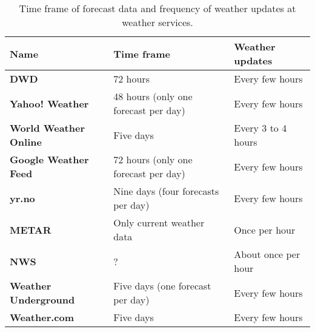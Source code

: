 \begin{table}
\centering
\begin{tabular}{|p{}|p{}|p{}|}
  \hline
  \textbf{Name} & \textbf{Time frame} & \textbf{Weather updates} \\
  \hline\hline
  \textbf{DWD} & 72 hours & Every few hours \\
  \hline
  \textbf{Yahoo! Weather} & 48 hours (only one forecast per day) & Every few hours \\
  \hline
  \textbf{World Weather Online} & Five days & Every \num{3} to \num{4} hours \\
  \hline
  \textbf{Google Weather Feed} & 72 hours (only one forecast per day) & Every few hours \\
  \hline
  \textbf{yr.no} & Nine days (four forecasts per day) & Every few hours \\
  \hline
  \textbf{\acs{METAR}} & Only current weather data & Once per hour \\
  \hline
  \textbf{\acs{NWS}} & ? & About once per hour \\ %
  \hline
  \textbf{Weather Underground} & Five days (one forecast per day) & Every few hours \\
  \hline
  \textbf{Weather.com} & Five days & Every few hours \\
  \hline
\end{tabular}
\vspace{.5em}
\caption{Time frame of forecast data and frequency of weather updates at weather services.}
\label{table:weather_data7}
\end{table}


